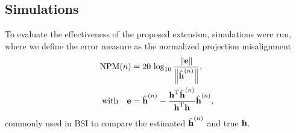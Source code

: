 \documentclass{article}
\begin{document}
\subsection[]{Simulations}
To evaluate the effectiveness of the proposed extension, simulations were run, where we define the error measure as the normalized projection misalignment
\begin{equation}
    \begin{aligned}
        \text{NPM}(n) &= 20\,\log_{10} \frac{\left\| \bm{\mathrm{e}} \right\|}{\left\|\hat{\bm{\mathrm{h}}}^{(n)}\right\|},\\
        \text{with}\quad \bm{\mathrm{e}} &= \hat{\bm{\mathrm{h}}}^{(n)} - \frac{\bm{\mathrm{h}}^{\mathrm{T}} \hat{\bm{\mathrm{h}}}^{(n)}}{\bm{\mathrm{h}}^{\mathrm{T}} \bm{\mathrm{h}}}\hat{\bm{\mathrm{h}}}^{(n)},
    \end{aligned}
\end{equation}
commonly used in BSI to compare the estimated \(\hat{\bm{\mathrm{h}}}^{(n)}\) and true \(\bm{\mathrm{h}}\).
\end{document}
